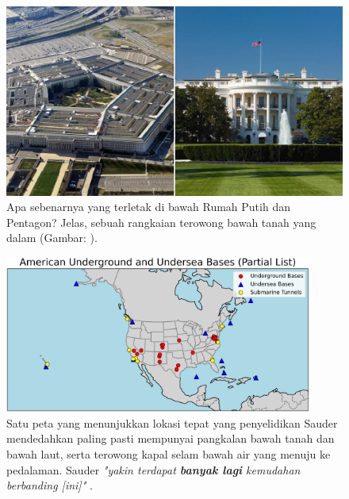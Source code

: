 \documentclass[10pt,twocolumn,letterpaper]{article}
\begin{document}
\begin{figure}[b]
\begin{center}
   \includegraphics[width=1\linewidth]{penta.jpg}
\end{center}
   \caption{Apa sebenarnya yang terletak di bawah Rumah Putih dan Pentagon? Jelas, sebuah rangkaian terowong bawah tanah yang dalam (Gambar: \cite{31}).}
\label{fig:3}
\label{fig:onecol}
\end{figure}
\begin{figure}[t]
\begin{center}
\includegraphics[width=0.9\textwidth]{basescrop.png}
\end{center}
   \caption{Satu peta yang menunjukkan lokasi tepat yang penyelidikan Sauder mendedahkan paling pasti mempunyai pangkalan bawah tanah dan bawah laut, serta terowong kapal selam bawah air yang menuju ke pedalaman. Sauder \textit{"yakin terdapat \textbf{banyak lagi} kemudahan berbanding [ini]"} \cite{22}.}
   \label{fig:4}
\end{figure}
\end{document}
